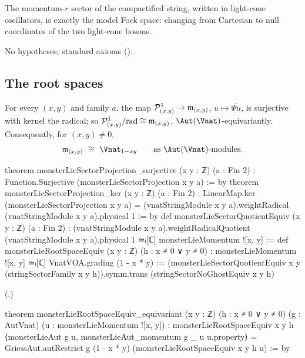 \begin{physics}
The momentum-$r$ sector of the compactified string, written in light-cone oscillators, is exactly the
model Fock space: changing from Cartesian to null coordinates of the two light-cone bosons.
\end{physics}
\begin{status}No hypotheses; standard axioms ().\end{status}

\subsection{The root spaces}

\begin{theorem}\label{ch18:thm:rootspaces}
For every $(x,y)$ and family $a$, the map $\mathcal{P}^1_{(x,y)}\to\mathfrak{m}_{(x,y)}$, $u\mapsto\overline{\Psi u}$, is surjective with
kernel the radical; so $\mathcal{P}^1_{(x,y)}/\mathrm{rad}\cong\mathfrak{m}_{(x,y)}$, $\Aut(\Vnat)$-equivariantly.  Consequently, for
$(x,y)\neq0$,
\begin{equation*}
  \chXVIIIm_{(x,y)}\ \cong\ \Vnat_{1-xy}\qquad\text{as }\Aut(\Vnat)\text{-modules}.
\end{equation*}
\end{theorem}
\begin{leancode}
theorem monsterLieSectorProjection_surjective (x y : ℤ) (a : Fin 2) :
    Function.Surjective (monsterLieSectorProjection x y a) := by
theorem monsterLieSectorProjection_ker (x y : ℤ) (a : Fin 2) :
    LinearMap.ker (monsterLieSectorProjection x y a) =
      (vnatStringModule x y a).weightRadical (vnatStringModule x y a).physical 1 := by
def monsterLieSectorQuotientEquiv (x y : ℤ) (a : Fin 2) :
    (vnatStringModule x y a).weightRadicalQuotient (vnatStringModule x y a).physical 1 ≃ₗ[ℂ]
      monsterLieMomentum ![x, y] :=
def monsterLieRootSpaceEquiv (x y : ℤ) (h : x ≠ 0 ∨ y ≠ 0) :
    monsterLieMomentum ![x, y] ≃ₗ[ℂ] VnatVOA.grading (1 - x * y) :=
  (monsterLieSectorQuotientEquiv x y (stringSectorFamily x y h)).symm.trans
    (stringSectorNoGhostEquiv x y h)
\end{leancode}
(.)
\begin{leancode}
theorem monsterLieRootSpaceEquiv_equivariant (x y : ℤ) (h : x ≠ 0 ∨ y ≠ 0)
    (g : AutVnat) (u : monsterLieMomentum ![x, y]) :
    monsterLieRootSpaceEquiv x y h
      ⟨monsterLieAut g u, monsterLieAut_momentum g _ u u.property⟩ =
      GriessAut.autRestrict g (1 - x * y) (monsterLieRootSpaceEquiv x y h u) := by
\end{leancode}

